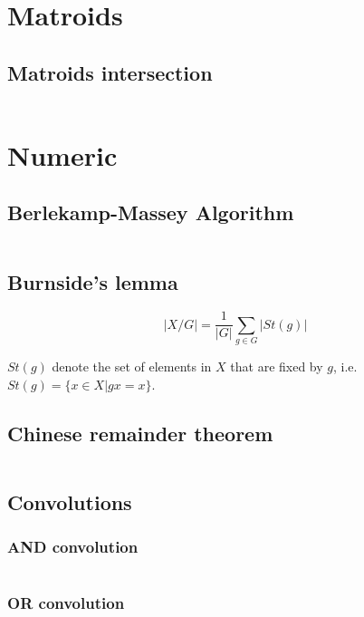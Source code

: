 \documentclass{article}
\begin{document}
\section{Matroids}
\subsection{Matroids intersection}
\inputminted[mathescape, breaklines, breakafter=(, tabsize=2, frame=lines, showtabs, tab=|\ , tabcolor=lightgray]{c++}{./matroids/matroids-intersection/matroids-intersection.cpp}
\section{Numeric}
\subsection{Berlekamp-Massey Algorithm}
\inputminted[mathescape, breaklines, breakafter=(, tabsize=2, frame=lines, showtabs, tab=|\ , tabcolor=lightgray]{c++}{./numeric/berlekamp/berlekamp.cpp}
\subsection{Burnside's lemma}
$$|X/G| = \frac{1}{|G|}\sum\limits_{g \in G}|St(g)|$$

$St(g)$ denote the set of elements in $X$ that are fixed by $g$, i.e. $St(g) = \{x \in X | gx = x\}$.
\subsection{Chinese remainder theorem}
\inputminted[mathescape, breaklines, breakafter=(, tabsize=2, frame=lines, showtabs, tab=|\ , tabcolor=lightgray]{c++}{./numeric/chinese-remainder-theorem/chinese-remainder-theorem.cpp}
\subsection{Convolutions}
\subsubsection{AND convolution}
\inputminted[mathescape, breaklines, breakafter=(, tabsize=2, frame=lines, showtabs, tab=|\ , tabcolor=lightgray]{c++}{./numeric/convolutions/and-conv/and-conv.cpp}
\subsubsection{OR convolution}
\inputminted[mathescape, breaklines, breakafter=(, tabsize=2, frame=lines, showtabs, tab=|\ , tabcolor=lightgray]{c++}{./numeric/convolutions/or-conv/or-conv.cpp}
\end{document}
